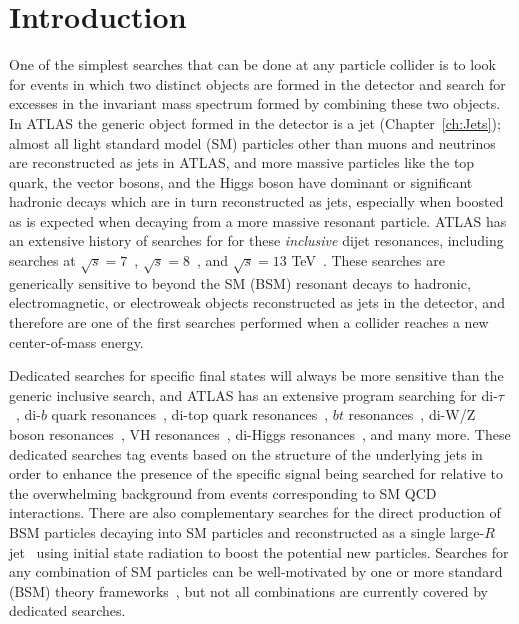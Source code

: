 \section{Introduction}
\label{sec:CWoLa:intro}
One of the simplest searches that can be done at any particle collider is to look for events in which two distinct objects are formed in the detector and search for excesses in the invariant mass spectrum formed by combining these two objects.
In ATLAS the generic object formed in the detector is a jet (Chapter~\ref{ch:Jets}); almost all light standard model (SM) particles other than muons and neutrinos are reconstructed as jets in ATLAS, and more massive particles like the top quark, the vector bosons, and the Higgs boson have dominant or significant hadronic decays which are in turn reconstructed as jets, especially when boosted as is expected when decaying from a more massive resonant particle.
ATLAS has an extensive history of searches for for these \textit{inclusive} dijet resonances, including searches at $\sqrt{s}=7$~\cite{Aad:2010ae,Aad:2011aj,Aad:2011fq}, $\sqrt{s}=8$~\cite{Aad:2014aqa}, and $\sqrt{s}=13$ TeV~\cite{ATLAS:2015nsi,Aaboud:2017yvp,Aaboud:2018fzt,Aad:2019hjw}.
These searches are generically sensitive to beyond the SM (BSM) resonant decays to hadronic, electromagnetic, or electroweak objects reconstructed as jets in the detector, and therefore are one of the first searches performed when a collider reaches a new center-of-mass energy.

Dedicated searches for specific final states will always be more sensitive than the generic inclusive search, and ATLAS has an extensive program searching for di-$\tau$~\cite{Aaboud:2016cre,Aaboud:2017sjh}, di-$b$ quark resonances~\cite{Aaboud:2016nbq,Aaboud:2018tqo}, di-top quark resonances~\cite{Aaboud:2018mjh}, $bt$ resonances~\cite{Aaboud:2018juj}, di-W/Z boson resonances~\cite{Aaboud:2016okv,Aaboud:2017fgj,Aaboud:2017itg,Aaboud:2017eta,Aad:2019fbh}, VH resonances~\cite{Aaboud:2018eoy,Aaboud:2017cxo,Aaboud:2017ahz}, di-Higgs resonances~\cite{Aaboud:2018knk}, and many more.
These dedicated searches tag events based on the structure of the underlying jets in order to enhance the presence of the specific signal being searched for relative to the overwhelming background from events corresponding to SM QCD interactions.
There are also complementary searches for the direct production of BSM particles decaying into SM particles and reconstructed as a single large-$R$ jet~\cite{Aaboud:2018zba,Aaboud:2018fzt,Aaboud:2019zxd} using initial state radiation to boost the potential new particles.
Searches for any combination of SM particles can be well-motivated by one or more standard (BSM) theory frameworks~\cite{Craig:2016rqv,Kim:2019rhy}, but not all combinations are currently covered by dedicated searches.

